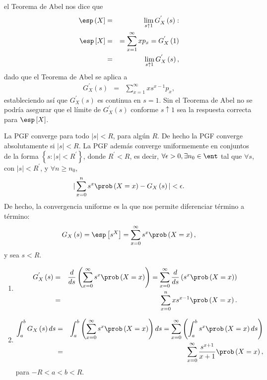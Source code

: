 el Teorema de Abel nos dice que
\begin{eqnarray*}
\esp\left(X\right]&=&\lim_{s\uparrow1}G_{X}^{'}\left(s\right):\\
\esp\left[X\right]&=&=\sum_{x=1}^{\infty}xp_{x}=G_{X}^{'}\left(1\right)\\
&=&\lim_{s\uparrow1}G_{X}^{'}\left(s\right),
\end{eqnarray*}
dado que el Teorema de Abel se aplica a
\begin{eqnarray*}
G_{X}^{'}\left(s\right)&=&\sum_{x=1}^{\infty}xs^{x-1}p_{x},
\end{eqnarray*}
estableciendo as\'i que $G_{X}^{'}\left(s\right)$ es continua en
$s=1$. Sin el Teorema de Abel no se podr\'ia asegurar que el
l\'imite de $G_{X}^{'}\left(s\right)$ conforme $s\uparrow1$ sea la
respuesta correcta para $\esp\left[X\right]$.

\begin{Note}
La PGF converge para todo $|s|<R$, para alg\'un $R$. De hecho la
PGF converge absolutamente si $|s|<R$. La PGF adem\'as converge
uniformemente en conjuntos de la forma
$\left\{s:|s|<R^{'}\right\}$, donde $R^{'}<R$, es decir,
$\forall\epsilon>0, \exists n_{0}\in\ent$ tal que $\forall s$, con
$|s|<R^{'}$, y $\forall n\geq n_{0}$,
\begin{eqnarray*}
|\sum_{x=0}^{n}s^{x}\prob\left(X=x\right)-G_{X}\left(s\right)|<\epsilon.
\end{eqnarray*}
De hecho, la convergencia uniforme es la que nos permite
diferenciar t\'ermino a t\'ermino:
\begin{eqnarray*}
G_{X}\left(s\right)=\esp\left[s^{X}\right]=\sum_{x=0}^{\infty}s^{x}\prob\left(X=x\right),
\end{eqnarray*}
y sea $s<R$.
\begin{enumerate}
\item
\begin{eqnarray*}
G_{X}^{'}\left(s\right)&=&\frac{d}{ds}\left(\sum_{x=0}^{\infty}s^{x}\prob\left(X=x\right)\right)=\sum_{x=0}^{\infty}\frac{d}{ds}\left(s^{x}\prob\left(X=x\right)\right)\\
&=&\sum_{x=0}^{n}xs^{x-1}\prob\left(X=x\right).
\end{eqnarray*}

\item\begin{eqnarray*}
\int_{a}^{b}G_{X}\left(s\right)ds&=&\int_{a}^{b}\left(\sum_{x=0}^{\infty}s^{x}\prob\left(X=x\right)\right)ds=\sum_{x=0}^{\infty}\left(\int_{a}^{b}s^{x}\prob\left(X=x\right)ds\right)\\
&=&\sum_{x=0}^{\infty}\frac{s^{x+1}}{x+1}\prob\left(X=x\right),
\end{eqnarray*}
para $-R<a<b<R$.
\end{enumerate}
\end{Note}

